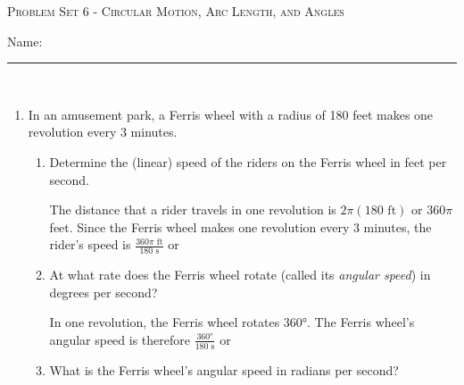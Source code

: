 \documentclass{article}
\begin{document}
\begin{center}
  \large\textsc{Problem Set 6 - Circular Motion, Arc Length, and Angles}
  
      \pspace{12pt}
  \begin{problemonly}\large Name: \rule{5cm}{0.15mm}\\ \end{problemonly}
\end{center}


\begin{enumerate}

\item 
\begin{problem}
    In an amusement park, a Ferris wheel with a radius of 180 feet makes one revolution every 3 minutes.
\end{problem}

\begin{enumerate}
    \item 
    \begin{problem}
    Determine the (linear) speed of the riders on the Ferris wheel in feet per second. 
    \end{problem}
    \pspace{\vfill}

    \begin{solution}
        The distance that a rider travels in one revolution is $2\pi(180\text{ ft})$ or $360\pi$ feet. Since the Ferris wheel makes one revolution every 3 minutes, the rider's speed is $\frac{360\pi\text{ ft}}{180\text{ s}}$ or 
    \end{solution}

    \item 
    \begin{problem}
        At what rate does the Ferris wheel rotate (called its \emph{angular speed}) in degrees per second?
    \end{problem}
    \pspace{\vfill}

    \begin{solution}
        In one revolution, the Ferris wheel rotates \ang{360}. The Ferris wheel's angular speed is therefore $\frac{\ang{360}}{180\text{ s}}$ or 
    \end{solution}



    \item 
    \begin{problem}
        What is the Ferris wheel's angular speed in radians per second?
    \end{problem}
    \pspace{\vfill}


\end{enumerate}
\end{enumerate}
\end{document}
